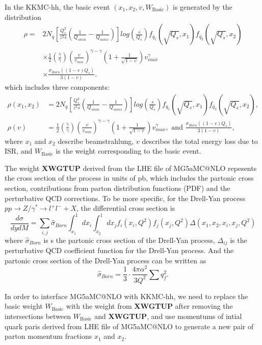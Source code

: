 In the KKMC-hh, the basic event $(x_1,x_2,v,W_\text{Basic})$ is generated by the distribution
 \begin{align}
 \rho =&  2N_q  [\frac{Q_s^2}{z^2s}(\frac{1}{Q_{smin}}-\frac{1}{Q_{samx}})]log(\frac{s}{Q_s})f_{q_1}(\sqrt{Q_s},x_1)f_{\bar{q}_2}(\sqrt{Q_s},x_2)\nonumber\\&\times \frac{1}{2} (\frac{\bar{\gamma}}{
 	\gamma}) (\frac{v}{v_{min}})^{\bar{\gamma}-\gamma} (1+\frac{1}{\sqrt{1-v}})v_{max}^{\gamma}\nonumber\\
 &\times\frac{ \sigma_{Born}((1-v)Q_s)}{3(1-v)}.
 \end{align}
 which includes three components: 
\begin{align*}
 \rho(x_1,x_2)&=2N_q  [\frac{Q_s^2}{z^2s}(\frac{1}{Q_{smin}}-\frac{1}{Q_{samx}})]log(\frac{s}{Q_s})f_{q_1}(\sqrt{Q_s},x_1)f_{\bar{q}_2}(\sqrt{Q_s},x_2),\nonumber\\
 \rho(v)&=\frac{1}{2} (\frac{\bar{\gamma}}{
 	\gamma}) (\frac{v}{v_{min}})^{\bar{\gamma}-\gamma} (1+\frac{1}{\sqrt{1-v}})v_{max}^{\gamma},\text{ and }
\frac{ \sigma_{Born}((1-v)Q_s)}{3(1-v)},
\end{align*} 
where $x_1$ and $x_2$ describe beamstrahlung, $v$ describes the total energy loss due to ISR, and $W_\text{Basic}$ is the weight corresponding to the basic event.



 The weight \textbf{XWGTUP} derived from the LHE file of MG5\textunderscore aMC@NLO repesents the cross section of the process in units of pb, which includes the partonic cross section, contributions from parton distribution functions (PDF) and the perturbative QCD corrections. To be more specific,
 for the Drell-Yan process $pp\rightarrow Z/\gamma^\ast\rightarrow l^+ l^-+X$, the differential cross section is
 \begin{equation}
 \frac{d\sigma}{dy dM}=\sum_{i,j}^{}\hat{\sigma}_{Born}\int_{x_1}^{1} dx_i\int_{x_2}^{1} dx_j f_i(x_i,Q^2) f_j(x_j,Q^2) \Delta(x_1,x_2,x_i,x_j,Q^2)
 \end{equation}
 where $\hat{\sigma}_{Born}$ is s the partonic cross section of the Drell-Yan process, $\Delta_{ij}$ is the
 perturbative QCD coefficient function for the Drell-Yan process. And the partonic cross section of the Drell-Yan process can be written as
 \begin{equation}
 \hat{\sigma}_{Born} = \frac{1}{3} \cdot \frac{4\pi\alpha^2}{3Q^2}\sum q_f^2.
 \end{equation}
 
 In order to interface MG5\textunderscore aMC@NLO with KKMC-hh, we need to replace the basic weight $W_\text{Basic}$ with the weight from \textbf{XWGTUP} after removing the intersections between $W_\text{Basic}$ and \textbf{XWGTUP}, and use momentums of intial quark paris derived from LHE file of MG5\textunderscore aMC@NLO to generate a new pair of parton momentum fractions $x_1$ and $x_2$.
 

